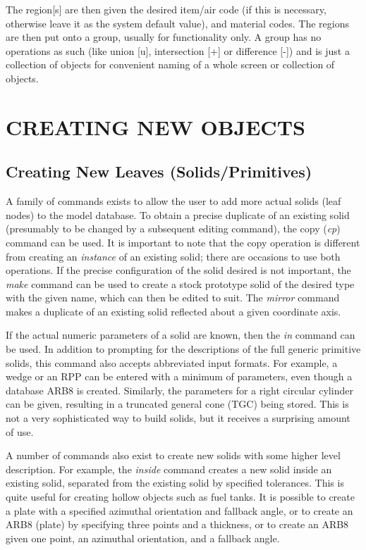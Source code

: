 The region[s] are then given the desired item/air code (if this is
necessary, otherwise leave it as the system default value), and material
codes.  The regions are then put onto a group, usually for functionality only.
A group has no operations as such (like union [u], intersection [+] or
difference [-]) and is just a collection of objects for convenient naming
of a whole screen or collection of objects.
\chapter{CREATING NEW OBJECTS}

\section{Creating New Leaves (Solids/Primitives)}

A family of commands exists to allow the user to add more actual
solids (leaf nodes) to the model database.  To obtain a precise
duplicate of an existing solid (presumably to be changed by a
subsequent editing command), the copy ({\em cp}) command can be used.
It is important to note that the copy operation is different from
creating an {\em instance} of an existing solid; there are occasions
to use both operations.  If the precise configuration of the solid
desired is not important, the {\em make} command can be used to create
a stock prototype solid of the desired type with the given name, which
can then be edited to suit.  The {\em mirror} command makes a
duplicate of an existing solid reflected about a given coordinate
axis.

If the actual numeric parameters of a solid are known, then the {\em in}
command can be used.  In addition to prompting for the descriptions of
the full generic primitive solids, this command also accepts
abbreviated input formats.  For example, a wedge or an RPP can be entered
with a minimum of parameters, even though a database ARB8 is created.
Similarly, the parameters for a right circular cylinder can be given,
resulting in a truncated general cone (TGC) being stored.
This is not a very sophisticated way to build solids, but it receives
a surprising amount of use.

A number of commands also exist to create new solids with some
higher level description.  For example, the {\em inside} command
creates a new solid inside an existing solid, separated from the
existing solid by specified tolerances.  This is quite useful for
creating hollow objects such as fuel tanks.
It is possible to create a plate with a specified
azimuthal orientation and fallback angle, or to create an ARB8 (plate)
by specifying three points and a thickness, or to create an ARB8
given one point, an azimuthal orientation, and a fallback angle.

